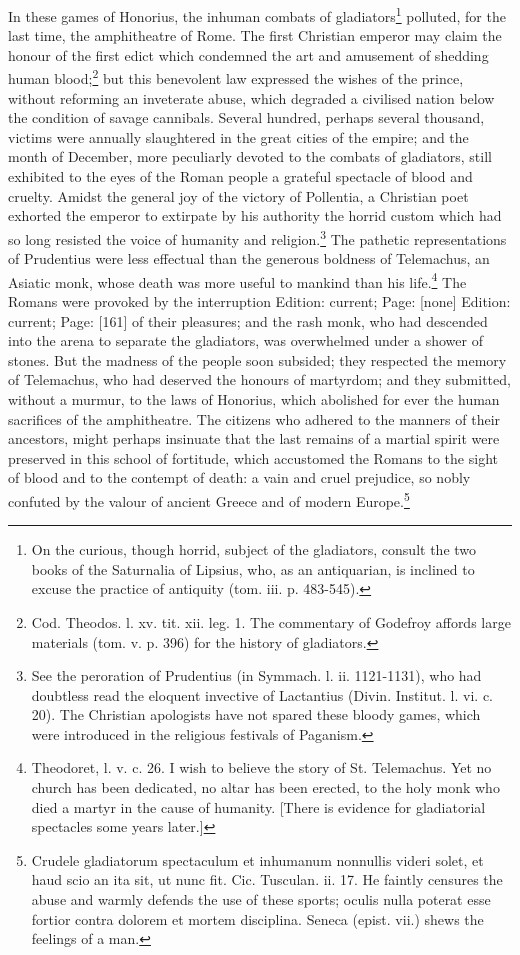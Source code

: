 In these games of Honorius, the inhuman combats of gladiators\footnote{On the curious, though horrid, subject of the gladiators, consult the two books of the Saturnalia of Lipsius, who, as an antiquarian, is inclined to excuse the practice of antiquity (tom. iii. p. 483-545).} polluted, for the last time, the amphitheatre of Rome. The first Christian emperor may claim the honour of the first edict which condemned the art and amusement of shedding human blood;\footnote{Cod. Theodos. l. xv. tit. xii. leg. 1. The commentary of Godefroy affords large materials (tom. v. p. 396) for the history of gladiators.} but this benevolent law expressed the wishes of the prince, without reforming an inveterate abuse, which degraded a civilised nation below the condition of savage cannibals. Several hundred, perhaps several thousand, victims were annually slaughtered in the great cities of the empire; and the month of December, more peculiarly devoted to the combats of gladiators, still exhibited to the eyes of the Roman people a grateful spectacle of blood and cruelty. Amidst the general joy of the victory of Pollentia, a Christian poet exhorted the emperor to extirpate by his authority the horrid custom which had so long resisted the voice of humanity and religion.\footnote{See the peroration of Prudentius (in Symmach. l. ii. 1121-1131), who had doubtless read the eloquent invective of Lactantius (Divin. Institut. l. vi. c. 20). The Christian apologists have not spared these bloody games, which were introduced in the religious festivals of Paganism.} The pathetic representations of Prudentius were less effectual than the generous boldness of Telemachus, an Asiatic monk, whose death was more useful to mankind than his life.\footnote{Theodoret, l. v. c. 26. I wish to believe the story of St. Telemachus. Yet no church has been dedicated, no altar has been erected, to the holy monk who died a martyr in the cause of humanity. [There is evidence for gladiatorial spectacles some years later.]} The Romans were provoked by the interruption Edition: current; Page: [none] Edition: current; Page: [161] of their pleasures; and the rash monk, who had descended into the arena to separate the gladiators, was overwhelmed under a shower of stones. But the madness of the people soon subsided; they respected the memory of Telemachus, who had deserved the honours of martyrdom; and they submitted, without a murmur, to the laws of Honorius, which abolished for ever the human sacrifices of the amphitheatre. The citizens who adhered to the manners of their ancestors, might perhaps insinuate that the last remains of a martial spirit were preserved in this school of fortitude, which accustomed the Romans to the sight of blood and to the contempt of death: a vain and cruel prejudice, so nobly confuted by the valour of ancient Greece and of modern Europe.\footnote{Crudele gladiatorum spectaculum et inhumanum nonnullis videri solet, et haud scio an ita sit, ut nunc fit. Cic. Tusculan. ii. 17. He faintly censures the abuse and warmly defends the use of these sports; oculis nulla poterat esse fortior contra dolorem et mortem disciplina. Seneca (epist. vii.) shews the feelings of a man.}

